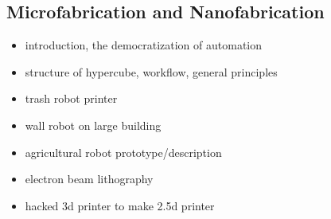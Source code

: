 \subsection{Microfabrication and Nanofabrication}



\begin{itemize}
\tightlist
\item
introduction, the democratization of automation
\item
structure of hypercube, workflow, general principles
\item
trash robot printer
\item
wall robot on large building
\item
agricultural robot prototype/description
\item
electron beam lithography
\item
hacked 3d printer to make 2.5d printer
\end{itemize}




